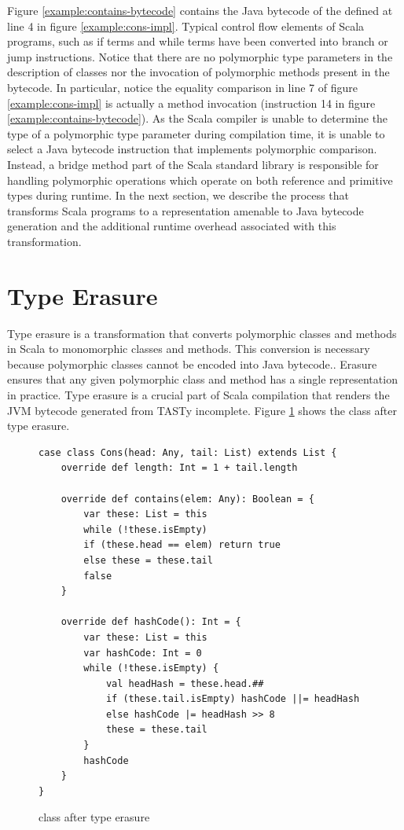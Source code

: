 Figure \ref{example:contains-bytecode} contains the Java bytecode of the  defined at line 4 in figure \ref{example:cons-impl}.
Typical control flow elements of Scala programs, such as if terms and while terms have been converted into branch or jump instructions.
Notice that there are no polymorphic type parameters in the description of classes nor the invocation of polymorphic methods present in the bytecode.
In particular, notice the equality comparison in line 7 of figure \ref{example:cons-impl} is actually a method invocation (instruction 14 in figure \ref{example:contains-bytecode}).
As the Scala compiler is unable to determine the type of a polymorphic type parameter during compilation time, it is unable to select a Java bytecode instruction that implements polymorphic comparison.
Instead, a bridge method part of the Scala standard library is responsible for handling polymorphic operations which operate on both reference and primitive types during runtime.
In the next section, we describe the process that transforms Scala programs to a representation amenable to Java bytecode generation and the additional runtime overhead associated with this transformation.

\section{Type Erasure}
\label{background:type-erasure}

Type erasure\cite{java:generics} is a transformation that converts polymorphic classes and methods in Scala to monomorphic classes and methods. 
This conversion is necessary because polymorphic classes cannot be encoded into Java bytecode..
Erasure ensures that any given polymorphic class and method has a single representation in practice.
Type erasure is a crucial part of Scala compilation that renders the JVM bytecode generated from TASTy incomplete.
Figure \ref{example:erase-cons} shows the  class after type erasure.

\begin{figure}[!htb]
\begin{verbatim}
case class Cons(head: Any, tail: List) extends List {
	override def length: Int = 1 + tail.length
		
	override def contains(elem: Any): Boolean = {
		var these: List = this
		while (!these.isEmpty) 
		if (these.head == elem) return true
		else these = these.tail
		false
	}
		
	override def hashCode(): Int = {
		var these: List = this
		var hashCode: Int = 0
		while (!these.isEmpty) {
			val headHash = these.head.##
			if (these.tail.isEmpty) hashCode ||= headHash
			else hashCode |= headHash >> 8
			these = these.tail	
		}
		hashCode
	}
}		
\end{verbatim}
\caption{ class after type erasure}
\label{example:erase-cons}
\end{figure}

